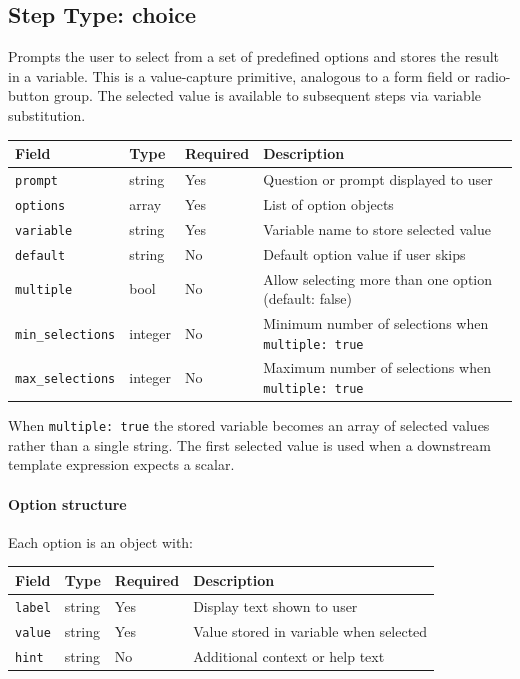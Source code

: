 \subsection{Step Type: choice}
\label{subsec:step-choice}

Prompts the user to select from a set of predefined options and stores the
result in a variable.  This is a value-capture primitive, analogous to a form
field or radio-button group.  The selected value is available to subsequent
steps via variable substitution.

\begin{center}
\begin{tabular}{lllp{5cm}}
\hline
\textbf{Field} & \textbf{Type} & \textbf{Required} & \textbf{Description} \\
\hline
\texttt{prompt}         & string  & Yes & Question or prompt displayed to user \\
\texttt{options}        & array   & Yes & List of option objects \\
\texttt{variable}       & string  & Yes & Variable name to store selected value \\
\texttt{default}        & string  & No  & Default option value if user skips \\
\texttt{multiple}       & bool    & No  & Allow selecting more than one option (default: false) \\
\texttt{min\_selections} & integer & No  & Minimum number of selections when \texttt{multiple: true} \\
\texttt{max\_selections} & integer & No  & Maximum number of selections when \texttt{multiple: true} \\
\hline
\end{tabular}
\end{center}

When \texttt{multiple: true} the stored variable becomes an array of selected values
rather than a single string.  The first selected value is used when a downstream
template expression expects a scalar.

\paragraph{Option structure}

Each option is an object with:

\begin{center}
\begin{tabular}{lllp{5cm}}
\hline
\textbf{Field} & \textbf{Type} & \textbf{Required} & \textbf{Description} \\
\hline
\texttt{label} & string & Yes & Display text shown to user \\
\texttt{value} & string & Yes & Value stored in variable when selected \\
\texttt{hint}  & string & No  & Additional context or help text \\
\hline
\end{tabular}
\end{center}

